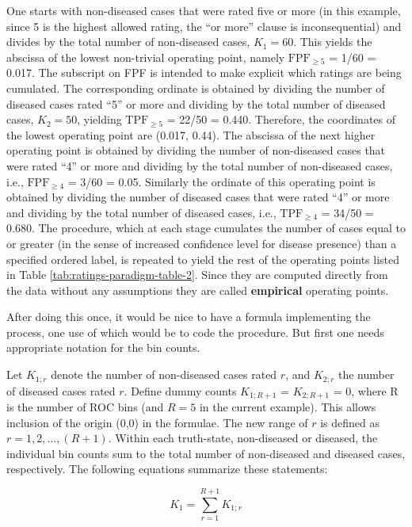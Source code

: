 \documentclass[
]{book}
\begin{document}
One starts with non-diseased cases that were rated five or more (in this example, since 5 is the highest allowed rating, the ``or more'' clause is inconsequential) and divides by the total number of non-diseased cases, \(K_1 = 60\). This yields the abscissa of the lowest non-trivial operating point, namely \(\text{FPF}_{\ge5}\) = 1/60 = 0.017. The subscript on FPF is intended to make explicit which ratings are being cumulated. The corresponding ordinate is obtained by dividing the number of diseased cases rated ``5'' or more and dividing by the total number of diseased cases, \(K_2 = 50\), yielding \(\text{TPF}_{\ge5}\) = 22/50 = 0.440. Therefore, the coordinates of the lowest operating point are (0.017, 0.44). The abscissa of the next higher operating point is obtained by dividing the number of non-diseased cases that were rated ``4'' or more and dividing by the total number of non-diseased cases, i.e., \(\text{FPF}_{\ge4}\) = 3/60 = 0.05. Similarly the ordinate of this operating point is obtained by dividing the number of diseased cases that were rated ``4'' or more and dividing by the total number of diseased cases, i.e., \(\text{TPF}_{\ge4}\) = 34/50 = 0.680. The procedure, which at each stage cumulates the number of cases equal to or greater (in the sense of increased confidence level for disease presence) than a specified ordered label, is repeated to yield the rest of the operating points listed in Table \ref{tab:ratings-paradigm-table-2}. Since they are computed directly from the data without any assumptions they are called \textbf{empirical} operating points.

After doing this once, it would be nice to have a formula implementing the process, one use of which would be to code the procedure. But first one needs appropriate notation for the bin counts.

Let \(K_{1;r}\) denote the number of non-diseased cases rated \(r\), and \(K_{2;r}\) the number of diseased cases rated \(r\). Define dummy counts \(K_{1;R+1}\) = \(K_{2;R+1}\) = 0, where R is the number of ROC bins (and \(R = 5\) in the current example). This allows inclusion of the origin (0,0) in the formulae. The new range of \(r\) is defined as \(r = 1,2,...,(R+1)\). Within each truth-state, non-diseased or diseased, the individual bin counts sum to the total number of non-diseased and diseased cases, respectively. The following equations summarize these statements:

\begin{equation*} 
K_1=\sum_{r=1}^{R+1}K_{1;r}
\end{equation*}
\end{document}
